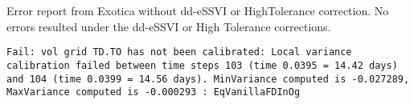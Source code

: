 \documentclass[11pt,letterpaper]{article}
\begin{document}
%

\begin{center}
Error report from Exotica without dd-eSSVI or HighTolerance correction. No errors resulted under the dd-eSSVI or High Tolerance corrections.

\texttt{Fail: vol grid TD.TO has not been calibrated: Local variance calibration failed between time steps 103 (time 0.0395 = 14.42 days) and 104 (time 0.0399 = 14.56 days). MinVariance computed is -0.027289, MaxVariance computed is -0.000293 : EqVanillaFDInOg }
\end{center}
\end{document}

